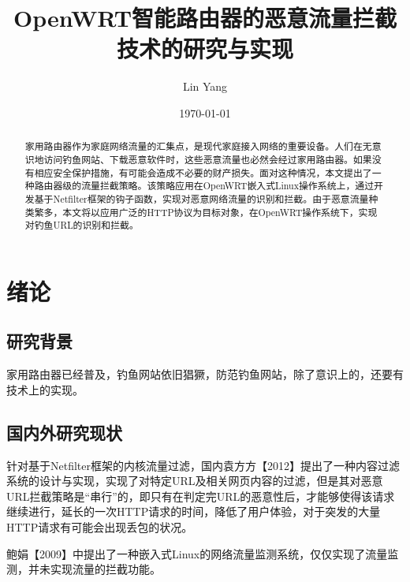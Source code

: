 \documentclass[a4paper,onecolumn,UTF8]{ctexart}
\title{OpenWRT智能路由器的恶意流量拦截技术的研究与实现}
\author{Lin Yang}
\date{\today}
\begin{document}
\tableofcontents
\maketitle
\begin{abstract}
  家用路由器作为家庭网络流量的汇集点，是现代家庭接入网络的重要设备。人们在无意识地访问钓鱼网站、下载恶意软件时，这些恶意流量也必然会经过家用路由器。如果没有相应安全保护措施，有可能会造成不必要的财产损失。面对这种情况，本文提出了一种路由器级的流量拦截策略。该策略应用在OpenWRT嵌入式Linux操作系统上，通过开发基于Netfilter框架的钩子函数，实现对恶意网络流量的识别和拦截。由于恶意流量种类繁多，本文将以应用广泛的HTTP协议为目标对象，在OpenWRT操作系统下，实现对钓鱼URL的识别和拦截。
\end{abstract}
\section{绪论}
\subsection{研究背景}
家用路由器已经普及，钓鱼网站依旧猖獗，防范钓鱼网站，除了意识上的，还要有技术上的实现。
\subsection{国内外研究现状}
针对基于Netfilter框架的内核流量过滤，国内袁方方【2012】提出了一种内容过滤系统的设计与实现，实现了对特定URL及相关网页内容的过滤，但是其对恶意URL拦截策略是“串行”的，即只有在判定完URL的恶意性后，才能够使得该请求继续进行，延长的一次HTTP请求的时间，降低了用户体验，对于突发的大量HTTP请求有可能会出现丢包的状况。
\par  鲍娟【2009】中提出了一种嵌入式Linux的网络流量监测系统，仅仅实现了流量监测，并未实现流量的拦截功能。
\end{document}
